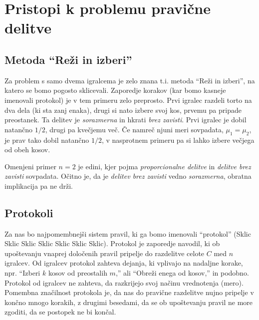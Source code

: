 \documentclass[a4paper,12pt]{article}
\begin{document}
\section{Pristopi k problemu pravične delitve}

\subsection{Metoda ``Reži in izberi''}

Za problem s samo dvema igralcema je zelo znana t.i. metoda ``Reži in izberi'', na katero se bomo pogosto sklicevali. Zaporedje korakov (kar bomo kasneje imenovali protokol) je v tem primeru zelo preprosto. Prvi igralec razdeli torto na dva dela (ki sta zanj enaka), drugi si nato izbere svoj kos, prvemu pa pripade preostanek. Ta delitev je {\em sorazmerna\/} in hkrati {\em brez zavisti\/}. Prvi igralec je dobil natančno $1/2$, drugi pa kvečjemu več. Če namreč njuni meri sovpadata, $\mu_1 = \mu_2$, je prav tako dobil natančno $1/2$, v nasprotnem primeru pa si lahko izbere večjega od obeh kosov.

Omenjeni primer $n = 2$ je edini, kjer pojma {\em proporcionalne delitve\/} in {\em delitve brez zavisti\/} sovpadata. Očitno je, da je {\em delitev brez zavisti\/} vedno {\em sorazmerna\/}, obratna implikacija pa ne drži.

%
%
%

\subsection{Protokoli}

Za nas bo najpomembnejši sistem pravil, ki ga bomo imenovali ``protokol'' (Sklic Sklic Sklic Sklic Sklic Sklic Sklic). Protokol je zaporedje navodil, ki ob upoštevanju vnaprej določenih pravil pripelje do razdelitve celote $C$ med $n$ igralcev. Od igralcev protokol zahteva dejanja, ki vplivajo na nadaljne korake, npr. ``Izberi $k$ kosov od preostalih $m$,'' ali ``Obreži enega od kosov,'' in podobno. Protokol od igralcev ne zahteva, da razkrijejo svoj načinu vrednotenja (mero). Pomembna značilnost protokola je, da nas do pravične razdelitve nujno pripelje v končno mnogo korakih, z drugimi besedami, da se ob upoštevanju pravil ne more zgoditi, da se postopek ne bi končal.
\end{document}
